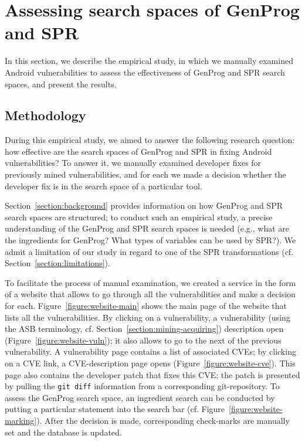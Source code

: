 \section{Assessing search spaces of GenProg and SPR}

In this section, we describe the empirical study, in which we manually examined \numvuln Android vulnerabilities to assess the effectiveness of GenProg and SPR search spaces, and present the results.

\subsection{Methodology}

During this empirical study, we aimed to answer the following research question: how effective are the search spaces of GenProg and SPR in fixing Android vulnerabilities?
To answer it, we manually examined developer fixes for \numvuln previously mined vulnerabilities, and for each we made a decision whether the developer fix is in the search space of a particular tool.

Section~\ref{section:background} provides information on how GenProg and SPR search spaces are structured; to conduct such an empirical study, a precise understanding of the GenProg and SPR search spaces is needed (e.g., what are the ingredients for GenProg? What types of variables can be used by SPR?).
We admit a limitation of our study in regard to one of the SPR transformations (cf. Section~\ref{section:limitations}).

To facilitate the process of manual examination, we created a service in the form of a website that allows to go through all the vulnerabilities and make a decision for each.
Figure~\ref{figure:website-main} shows the main page of the website that lists all the vulnerabilities.
By clicking on a vulnerability, a vulnerability (using the ASB terminology, cf. Section~\ref{section:mining-acquiring}) description open (Figure~\ref{figure:website-vuln}); it also allows to go to the next of the previous vulnerability.
A vulnerability page contains a list of associated CVEs; by clicking on a CVE link, a CVE-description page opens (Figure~\ref{figure:website-cve}).
This page also contains the developer patch that fixes this CVE; the patch is presented by pulling the \texttt{git diff} information from a corresponding git-repository.
To assess the GenProg search space, an ingredient search can be conducted by putting a particular statement into the search bar (cf. Figure~\ref{figure:website-marking}).
After the decision is made, corresponding check-marks are manually set and the database is updated.

